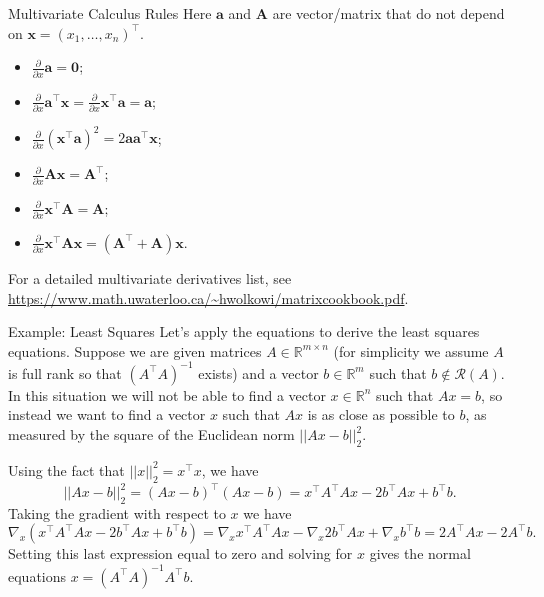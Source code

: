 \documentclass[10pt]{beamer}
\begin{document}
\begin{frame}{Multivariate Calculus Rules}
Here $\textbf{a}$ and $\textbf{A}$ are vector/matrix that do not depend on $\textbf{x}=(x_1,\dots,x_n)^\intercal$.
\begin{itemize}
    \item $\frac{\partial}{\partial x} \textbf{a} = \textbf{0}$;
    \item $\frac{\partial}{\partial x} \textbf{a}^\intercal \textbf{x} = \frac{\partial}{\partial x} \textbf{x}^\intercal \textbf{a} = \textbf{a}$;
    \item $\frac{\partial}{\partial x} (\textbf{x}^\intercal \textbf{a})^2 = 2  \textbf{a}\textbf{a}^\intercal \textbf{x}$;
    \item $\frac{\partial}{\partial x} \textbf{A}\textbf{x} = \textbf{A}^\top$;
    \item $\frac{\partial}{\partial x} \textbf{x}^\intercal\textbf{A} = \textbf{A}$;
    \item $\frac{\partial}{\partial x} \textbf{x}^\top \textbf{A}\textbf{x} = (\textbf{A}^\intercal+\textbf{A})\textbf{x}$.
\end{itemize}

For a detailed multivariate derivatives list, see \url{https://www.math.uwaterloo.ca/~hwolkowi/matrixcookbook.pdf}.
\end{frame}

\begin{frame}{Example: Least Squares}
 Let’s apply the equations to derive the least squares equations.
Suppose we are given matrices $A\in \mathbb{R}^{m\times n}$ (for simplicity we assume $A$ is full rank so that $(A^\top A)^{-1}$ exists) and a vector $b\in \mathbb{R}^m$ such that $b\not\in \mathcal{R}(A)$. In this situation we will not be able to find a vector $x\in \mathbb{R}^n$ such that $Ax=b$, so instead we want to find a vector $x$ such that $Ax$ is as close as possible to $b$, as measured by the square of the Euclidean norm $||Ax - b||^2_2$.

Using the fact that $||x||^2_2 = x^\intercal x$, we have
$$||Ax - b||^2_2 = (Ax - b)^\intercal(Ax - b) = x^\intercal A^\intercal Ax - 2b^\intercal Ax + b^\intercal b.$$
Taking the gradient with respect to $x$ we have
$$\nabla_x(x^\intercal A^\intercal Ax - 2b^\intercal Ax + b^\intercal b) = \nabla_x x^\intercal A^\intercal Ax - \nabla_x 2b^\intercal Ax + \nabla_x b^\intercal b = 2A^\intercal Ax - 2A^\intercal b.$$
Setting this last expression equal to zero and solving for $x$ gives the normal equations $x= (A^\intercal A)^{-1}A^\intercal b$.
\end{frame}
\end{document}
